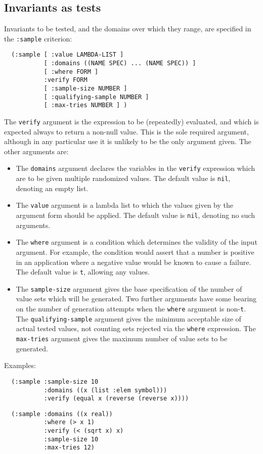 \subsection{Invariants as tests}
Invariants to be tested, and the domains over which they range, are
specified in the \texttt{:sample} criterion:
\begin{verbatim}
  (:sample [ :value LAMBDA-LIST ]
           [ :domains ((NAME SPEC) ... (NAME SPEC)) ]
           [ :where FORM ]
           :verify FORM
           [ :sample-size NUMBER ]
           [ :qualifying-sample NUMBER ]
           [ :max-tries NUMBER ] )
\end{verbatim}
The \texttt{verify} argument is the expression to be (repeatedly)
evaluated, and which is expected always to return a non-null value.
This is the sole required argument, although in any particular use it
is unlikely to be the only argument given.  The other arguments are:
\begin{itemize}
\item The \texttt{domains} argument declares the variables in the
  \texttt{verify} expression which are to be given multiple randomized
  values.  The default value is \texttt{nil}, denoting an empty list.
\item The \texttt{value} argument is a lambda list to which the values
  given by the argument form should be applied.  The default value is
  \texttt{nil}, denoting no such arguments.
\item The \texttt{where} argument is a condition which determines the
  validity of the input argument.  For example, the condition would
  assert that a number is positive in an application where a negative
  value would be known to cause a failure.  The default value is
  \texttt{t}, allowing any values.
\item The \texttt{sample-size} argument gives the base specification
  of the number of value sets which will be generated.  Two further
  arguments have some bearing on the number of generation attempts
  when the \texttt{where} argument is non-\texttt{t}.  The
  \texttt{qualifying-sample} argument gives the minimum acceptable
  size of actual tested values, not counting sets rejected via the
  \texttt{where} expression.  The \texttt{max-tries} argument gives
  the maximum number of value sets to be generated.
\end{itemize}

Examples:
\begin{verbatim}
  (:sample :sample-size 10
           :domains ((x (list :elem symbol)))
           :verify (equal x (reverse (reverse x))))
\end{verbatim}

\begin{verbatim}
  (:sample :domains ((x real))
           :where (> x 1)
           :verify (< (sqrt x) x)
           :sample-size 10
           :max-tries 12)
\end{verbatim}

\begin{verbatim}

\end{verbatim}

